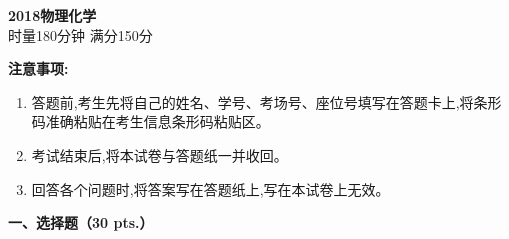 \begin{center}
    {\LARGE \textbf{2018物理化学}} \\[2ex]
    {\large 时量180分钟 \quad 满分150分}
\end{center}

\vspace{0.5cm}
\noindent\textbf{注意事项:}
\begin{enumerate}[label=\arabic*., parsep=0pt, itemsep=0pt]
    \item 答题前,考生先将自己的姓名、学号、考场号、座位号填写在答题卡上,将条形码准确粘贴在考生信息条形码粘贴区。
    \item 考试结束后,将本试卷与答题纸一并收回。
    \item 回答各个问题时,将答案写在答题纸上,写在本试卷上无效。
\end{enumerate}

\vspace{0.5cm}
\noindent\textbf{一、选择题（30 pts.）}

